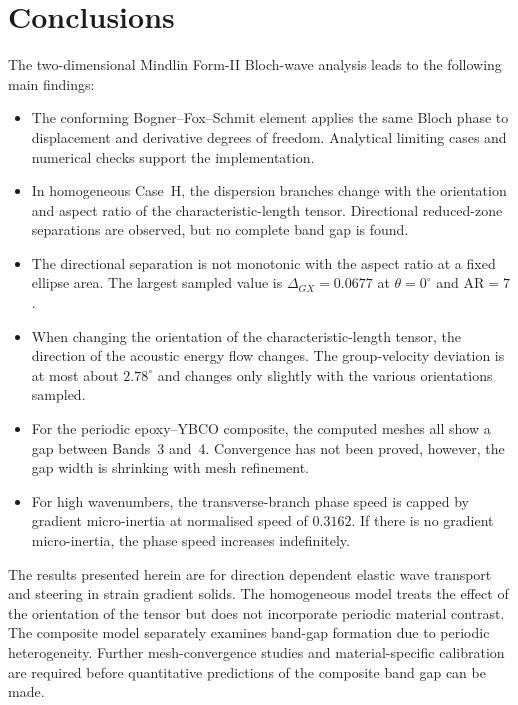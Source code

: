 
\section{Conclusions}
\label{sec:conclusions}

The two-dimensional Mindlin Form-II Bloch-wave analysis leads to the following main findings:

\begin{itemize}
    \item The conforming Bogner--Fox--Schmit element applies the same Bloch phase to displacement and derivative degrees of freedom. Analytical limiting cases and numerical checks support the implementation.

    \item In homogeneous Case~H, the dispersion branches change with the orientation and aspect ratio of the characteristic-length tensor. Directional reduced-zone separations are observed, but no complete band gap is found.

    \item The directional separation is not monotonic with the aspect ratio at a fixed ellipse area. The largest sampled value is $\Delta_{GX}=0.0677$ at $\theta=0^\circ$ and $\mathrm{AR}=7$.

    \item When changing the orientation of the characteristic-length tensor, the direction of the acoustic energy flow changes. The group-velocity deviation is at most about $2.78^\circ$ and changes only slightly with the various orientations sampled.

    \item For the periodic epoxy--YBCO composite, the computed meshes all show a gap between Bands~3 and~4. Convergence has not been proved, however, the gap width is shrinking with mesh refinement.
    \item For high wavenumbers, the transverse-branch phase speed is capped by gradient micro-inertia at normalised speed of $0.3162$. If there is no gradient micro-inertia, the phase speed increases indefinitely.
\end{itemize}

The results presented herein are for direction dependent elastic wave transport and steering in strain gradient solids. The homogeneous model treats the effect of the orientation of the tensor but does not incorporate periodic material contrast. The composite model separately examines band-gap formation due to periodic heterogeneity. Further mesh-convergence studies and material-specific calibration are required before quantitative predictions of the composite band gap can be made.
